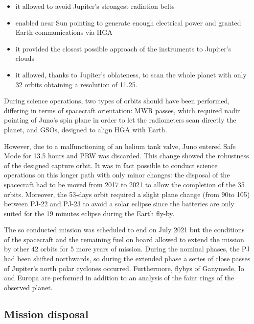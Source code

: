 \begin{itemize}
    \item it allowed to avoid Jupiter's strongest radiation belts
    \item enabled near Sun pointing to generate enough electrical power and granted Earth communications via HGA
    \item it provided the closest possible approach of the instruments to Jupiter's clouds 
    \item it allowed, thanks to Jupiter's oblateness, to scan the whole planet with only 32 orbits obtaining a resolution of 11.25\textdegree.
\end{itemize}

During science operations, two types of orbits should have been performed, differing in terms of spacecraft orientation: MWR passes, which required nadir pointing of Juno's spin plane in order to let the radiometers scan directly the planet, and GSOs, designed to align HGA with Earth. 

However, due to a malfunctioning of an helium tank valve, Juno entered Safe Mode for 13.5 hours and PRW was discarded. This change showed the robustness of the designed capture orbit. It was in fact possible to conduct science operations on this longer path with only minor changes: the disposal of the spacecraft had to be moved from 2017 to 2021 to allow the completion of the 35 orbits. Moreover, the 53-days orbit required a slight plane change (from 90\textdegree \;to 105\textdegree) between PJ-22 and PJ-23 to avoid a solar eclipse since the batteries are only suited for the 19 minutes eclipse during the Earth fly-by. 

The so conducted mission was scheduled to end on July 2021 but the conditions of the spacecraft and the remaining fuel on board allowed to extend the mission by other 42 orbits for 5 more years of mission. During the nominal phases, the PJ had been shifted northwards, so during the extended phase a series of close passes of Jupiter's north polar cyclones occurred. Furthermore, flybys of Ganymede, Io and Europa are performed in addition to an analysis of the faint rings of the observed planet. \cite{fact_sheet}


\subsection{Mission disposal}
\label{sec: disposal}

